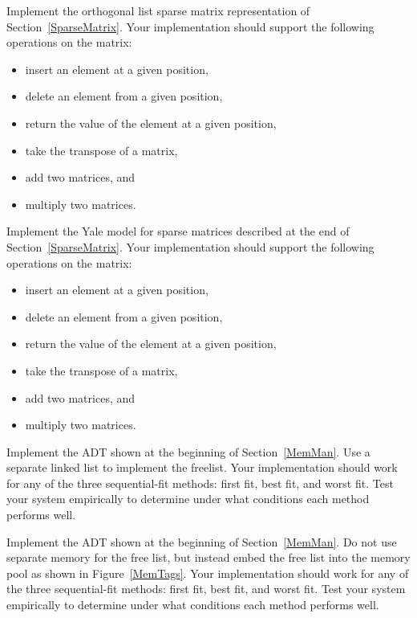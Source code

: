 \begin{projects}

\item
Implement the orthogonal list sparse matrix representation of
Section~\ref{SparseMatrix}.
Your implementation should support the following operations on the
matrix:
\begin{itemize}
\item insert an element at a given position,
\item delete an element from a given position,
\item return the value of the element at a given position,
\item take the transpose of a matrix,
\item add two matrices, and
\item multiply two matrices.
\end{itemize}

\item
Implement the Yale model for sparse matrices described at the end of
Section~\ref{SparseMatrix}.
Your implementation should support the following operations on the
matrix:
\begin{itemize}
\item insert an element at a given position,
\item delete an element from a given position,
\item return the value of the element at a given position,
\item take the transpose of a matrix,
\item add two matrices, and
\item multiply two matrices.
\end{itemize}

\item
Implement the  ADT
shown at the beginning of
Section~\ref{MemMan}.
Use a separate linked list to implement the freelist.
Your implementation should work for any of the three sequential-fit
methods: first fit, best fit, and worst fit.
Test your system empirically to determine under what conditions each
method performs well.

\item
Implement the  ADT
shown at the beginning of
Section~\ref{MemMan}. 
Do not use separate memory for the free list, but instead embed the
free list into the memory pool as shown in Figure~\ref{MemTags}.
Your implementation should work for any of the three sequential-fit
methods: first fit, best fit, and worst fit.
Test your system empirically to determine under what conditions each
method performs well.


\end{projects}
